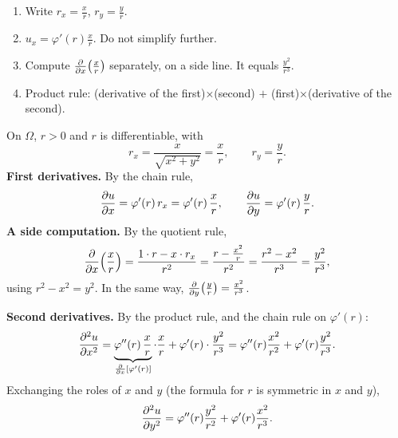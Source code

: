 \begin{howto}
\begin{enumerate}
  \item Write $r_x=\frac xr$, $r_y=\frac yr$.
  \item $u_x=\varphi'(r)\frac xr$. Do not simplify further.
  \item Compute $\frac{\partial }{\partial x}\big(\frac xr\big)$ separately, on a side line. It equals $\frac{y^2}{r^3}$.
  \item Product rule: (derivative of the first)$\times$(second) $+$ (first)$\times$(derivative of the second).
\end{enumerate}
\end{howto}

\begin{answer}
On $\Omega$, $r>0$ and $r$ is differentiable, with
\[
  r_x=\frac{x}{\sqrt{x^2+y^2}}=\frac xr,\qquad r_y=\frac yr .
\]
\textbf{First derivatives.} By the chain rule,
\[
  \frac{\partial u}{\partial x}=\varphi'(r)\,r_x=\varphi'(r)\,\frac xr,\qquad \frac{\partial u}{\partial y}=\varphi'(r)\,\frac yr .
\]
\textbf{A side computation.} By the quotient rule,
\[
  \frac{\partial }{\partial x}\Big(\frac xr\Big)=\frac{1\cdot r-x\cdot r_x}{r^2}=\frac{r-\frac{x^2}r}{r^2}=\frac{r^2-x^2}{r^3}=\frac{y^2}{r^3},
\]
using $r^2-x^2=y^2$. In the same way, $\frac{\partial }{\partial y}\big(\frac yr\big)=\frac{x^2}{r^3}$.

\textbf{Second derivatives.} By the product rule, and the chain rule on $\varphi'(r)$:
\[
  \frac{\partial^2 u}{\partial x^2}=\underbrace{\varphi''(r)\,\frac xr}_{\frac{\partial }{\partial x}[\varphi'(r)]}\cdot\frac xr+\varphi'(r)\cdot\frac{y^2}{r^3}
  =\varphi''(r)\frac{x^2}{r^2}+\varphi'(r)\frac{y^2}{r^3}.
\]
Exchanging the roles of $x$ and $y$ (the formula for $r$ is symmetric in $x$ and $y$),
\[
  \frac{\partial^2 u}{\partial y^2}=\varphi''(r)\frac{y^2}{r^2}+\varphi'(r)\frac{x^2}{r^3}.
\]
\end{answer}

\begin{center}
\end{center}

